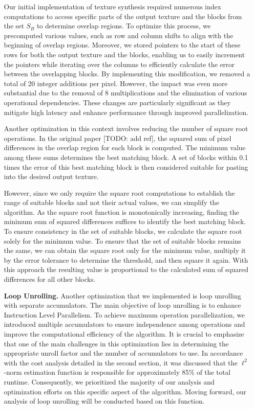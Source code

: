 \documentclass[letterpaper]{article}
\newcommand{\mypar}[1]{{\bf #1.}}
\begin{document}
Our initial implementation of texture synthesis required numerous index computations to access specific parts of the output texture and the blocks from the set \textit{$S_{B}$} to determine overlap regions. To optimize this process, we precomputed various values, such as row and column shifts to align with the beginning of overlap regions. Moreover, we stored pointers to the start of these rows for both the output texture and the blocks, enabling us to easily increment the pointers while iterating over the columns to efficiently calculate the error between the overlapping blocks. By implementing this modification, we removed a total of 20 integer additions per pixel. However, the impact was even more substantial due to the removal of 8 multiplications and the elimination of various operational dependencies. These changes are particularly significant as they mitigate high latency and enhance performance through improved parallelization.

Another optimization in this context involves reducing the number of square root operations. In the original paper [TODO: add ref], the squared sum of pixel differences in the overlap region for each block is computed. The minimum value among these sums determines the best matching block. A set of blocks within 0.1 times the error of this best matching block is then considered suitable for pasting into the desired output texture.

However, since we only require the square root computations to establish the range of suitable blocks and not their actual values, we can simplify the algorithm. As the square root function is monotonically increasing, finding the minimum sum of squared differences suffices to identify the best matching block. To ensure consistency in the set of suitable blocks, we calculate the square root solely for the minimum value. To ensure that the set of suitable blocks remains the same, we can obtain the square root only for the minimum value, multiply it by the error tolerance to determine the threshold, and then square it again. With this approach the resulting value is proportional to the calculated sum of squared differences for all other blocks. 

\mypar{Loop Unrolling} 
Another optimization that we implemented is loop unrolling with separate accumulators. The main objective of loop unrolling is to enhance Instruction Level Parallelism. To achieve maximum operation parallelization, we introduced multiple accumulators to ensure independence among operations and improve the computational efficiency of the algorithm. It is crucial to emphasize that one of the main challenges in this optimization lies in determining the appropriate unroll factor and the number of accumulators to use. 
In accordance with the cost analysis detailed in the second section, it was discussed that the $\ell^2$-norm estimation function is responsible for approximately 85\% of the total runtime. Consequently, we prioritized the majority of our analysis and optimization efforts on this specific aspect of the algorithm. Moving forward, our analysis of loop unrolling will be conducted based on this function.
\end{document}

